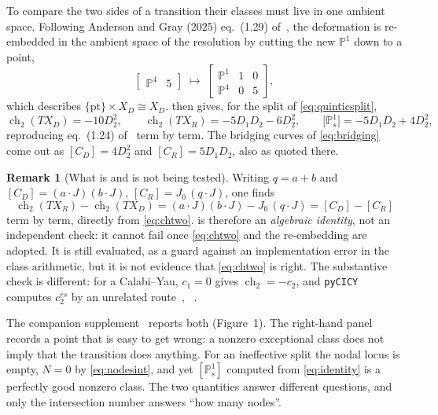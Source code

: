 \documentclass[11pt,a4paper]{article}
\newcommand{\PP}{\mathbb{P}}
\newcommand{\ch}{\operatorname{ch}}
\newcommand{\XD}{X_D}
\newcommand{\XR}{X_R}
\theoremstyle{definition}
\newtheorem{remark}{Remark}
\begin{document}
To compare the two sides of a transition their classes must live in one
ambient space. Following Anderson and Gray (2025) eq.~(1.29) of~\cite{Anderson2025}, the deformation
is re-embedded in the ambient space of the resolution by cutting the new
$\PP^1$ down to a point,
%
\begin{equation}
\begin{bmatrix}\PP^4 & 5\end{bmatrix}
\;\longmapsto\;
\begin{bmatrix}\PP^1 & 1 & 0\\ \PP^4 & 0 & 5\end{bmatrix},
\label{eq:reembed}
\end{equation}
%
which describes $\{\text{pt}\}\times X_D \cong X_D$.  then
gives, for the split of \cref{eq:quinticsplit},
%
\begin{equation}
\ch_2(T\XD) = -10 D_2^2,
\qquad
\ch_2(T\XR) = -5D_1D_2 - 6D_2^2,
\qquad
\bigl[\PP^1_s\bigr] = -5D_1D_2 + 4D_2^2 ,
\label{eq:ch124}
\end{equation}
%
reproducing eq.~(1.24) of~\cite{Anderson2025} term by term. The bridging
curves of \cref{eq:bridging} come out as $[C_D] = 4D_2^2$ and
$[C_R] = 5D_1D_2$, also as quoted there.

\begin{remark}[What is and is not being tested]
\label{rem:identity}
Writing $q = a + b$ and $[C_D] = (a\!\cdot\!J)(b\!\cdot\!J)$,
$[C_R] = J_0\,(q\!\cdot\!J)$, one finds
%
\begin{equation}
\ch_2(T\XR) - \ch_2(T\XD)
= (a\!\cdot\!J)(b\!\cdot\!J) - J_0\,(q\!\cdot\!J)
= [C_D] - [C_R]
\label{eq:identity}
\end{equation}
%
term by term, directly from \cref{eq:chtwo}.  is therefore
an \emph{algebraic identity}, not an independent check: it cannot fail once
\cref{eq:chtwo} and the re-embedding are adopted. It is still evaluated, as a
guard against an implementation error in the class arithmetic, but it is not
evidence that \cref{eq:chtwo} is right. The substantive check is different:
for a Calabi--Yau, $c_1=0$ gives $\ch_2 = -c_2$, and \texttt{pyCICY}
computes $c_2^{rs}$ by an unrelated route~\cite{Larfors2019}, ~\cite{SuppFigures}.
\end{remark}

The companion supplement~\cite{SuppFigures} reports both (Figure~1). The right-hand panel records a point that is
easy to get wrong: a nonzero exceptional class does not imply that the
transition does anything. For an ineffective split the nodal locus is empty,
$N=0$ by \cref{eq:nodesint}, and yet $[\PP^1_s]$ computed from
\cref{eq:identity} is a perfectly good nonzero class. The two quantities
answer different questions, and only the intersection number answers
``how many nodes''.
\end{document}
